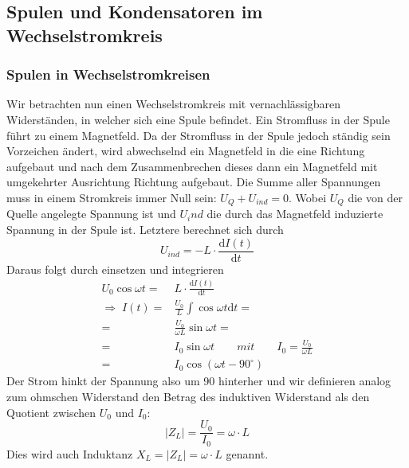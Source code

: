 
\subsection{Spulen und Kondensatoren im Wechselstromkreis}

\subsubsection{Spulen in Wechselstromkreisen}
Wir betrachten nun einen Wechselstromkreis mit vernachlässigbaren Widerständen, in welcher sich eine Spule befindet. Ein Stromfluss in der Spule führt zu einem Magnetfeld. Da der Stromfluss in der Spule jedoch ständig sein Vorzeichen ändert, wird abwechselnd ein Magnetfeld in die eine Richtung aufgebaut und nach dem Zusammenbrechen dieses dann ein Magnetfeld mit umgekehrter Ausrichtung Richtung aufgebaut.
Die Summe aller Spannungen muss in einem Stromkreis immer Null sein:
$ U_Q + U_{ind} = 0 $.
Wobei $U_Q$ die von der Quelle angelegte Spannung ist und $U_ind$ die durch das Magnetfeld induzierte Spannung in der Spule ist. Letztere berechnet sich durch
\begin{equation}
U_{ind} = - L \cdot \frac{\mathrm dI(t)}{\mathrm dt}
\end{equation}
Daraus folgt durch einsetzen und integrieren
\begin{align}
U_0 \cos \omega t =& L \cdot \frac{\mathrm dI(t)}{\mathrm dt} \nonumber \\ 
\Rightarrow\; I(t) =& \frac{U_0}{L} \int \cos \omega t \mathrm dt = \nonumber \\ 
=& \frac{U_0}{\omega L} \sin \omega t = \nonumber\\
=& I_0 \sin \omega t \qquad mit\qquad I_0 = \frac{U_0}{\omega L}  \nonumber\\
=& I_0 \cos(\omega t - 90^\circ)
\end{align}
Der Strom hinkt der Spannung also um \unit{90}{\degree} hinterher und wir definieren analog zum ohmschen Widerstand den Betrag des induktiven Widerstand als den Quotient zwischen $U_0$ und $I_0$:
\begin{equation}
\left|Z_L\right| = \frac{U_0}{I_0} = \omega \cdot L
\end{equation}
Dies wird auch Induktanz $X_L = \left|Z_L\right| = \omega \cdot L$ genannt.

